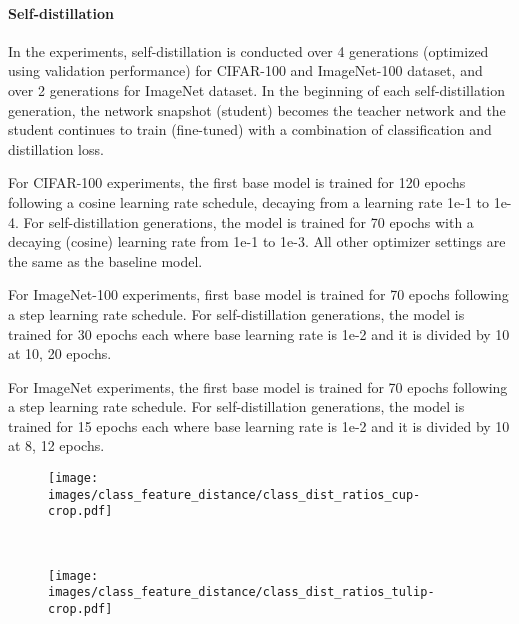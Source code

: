 \documentclass[final]{cvpr}
\newcommand{\ilkd}{CCIL }
\begin{document}
\paragraph{Self-distillation}
In the experiments, self-distillation is conducted over 4 generations (optimized using validation performance) for CIFAR-100 and ImageNet-100 dataset, and over 2 generations for ImageNet dataset. In the beginning of each self-distillation generation, the network snapshot (student) becomes the teacher network and the student continues to train (fine-tuned) with a combination of classification and distillation loss. 

For CIFAR-100 experiments, the first base model is trained for 120 epochs following a cosine learning rate schedule, decaying from a learning rate 1e-1 to 1e-4. For self-distillation generations, the model is trained for 70 epochs with a decaying (cosine) learning rate from 1e-1 to 1e-3. All other optimizer settings are the same as the baseline model.

For ImageNet-100 experiments, first base model is trained for 70 epochs following a step learning rate schedule. For self-distillation generations, the model is trained for 30 epochs each where base learning rate is 1e-2 and it is divided by 10 at {10, 20} epochs.

For ImageNet experiments, the first base model is trained for 70 epochs following a step learning rate schedule. For self-distillation generations, the model is trained for 15 epochs each where base learning rate is 1e-2 and it is divided by 10 at {8, 12} epochs.



\begin{figure*}[!t]
    \centering
    \begin{subfigure}{0.40\textwidth}
        \centering
        \texttt{[image: images/class\_feature\_distance/class\_dist\_ratios\_cup-crop.pdf]}
        \caption{}
    \end{subfigure}~ 
    \begin{subfigure}{0.40\textwidth}
        \centering
        \texttt{[image: images/class\_feature\_distance/class\_dist\_ratios\_tulip-crop.pdf]}
        \caption{}
    \end{subfigure}
    \caption{Effect of regularizers on the distance between mean class representations. 
    The numbers shown in the plot are the ratios between the class means distances of each method and of the default \ilkd model.
    Similar classes are marked in \textbf{bold}.\textit{ Dotted} circle at 1.0 depicts distances between classes in the baseline \ilkd model and other distances are depicted relative to the baseline model. \textit{Positive} and \textit{negative} cases indicate similar and dissimilar classes respectively.  }   
    \label{fig:app:class_mean}
\end{figure*}
\end{document}
